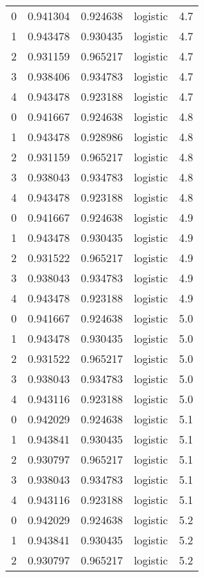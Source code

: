 \begin{tabular}{rrrlr}
     0 & 0.941304 & 0.924638 & logistic &        4.7 \\
     1 & 0.943478 & 0.930435 & logistic &        4.7 \\
     2 & 0.931159 & 0.965217 & logistic &        4.7 \\
     3 & 0.938406 & 0.934783 & logistic &        4.7 \\
     4 & 0.943478 & 0.923188 & logistic &        4.7 \\
     0 & 0.941667 & 0.924638 & logistic &        4.8 \\
     1 & 0.943478 & 0.928986 & logistic &        4.8 \\
     2 & 0.931159 & 0.965217 & logistic &        4.8 \\
     3 & 0.938043 & 0.934783 & logistic &        4.8 \\
     4 & 0.943478 & 0.923188 & logistic &        4.8 \\
     0 & 0.941667 & 0.924638 & logistic &        4.9 \\
     1 & 0.943478 & 0.930435 & logistic &        4.9 \\
     2 & 0.931522 & 0.965217 & logistic &        4.9 \\
     3 & 0.938043 & 0.934783 & logistic &        4.9 \\
     4 & 0.943478 & 0.923188 & logistic &        4.9 \\
     0 & 0.941667 & 0.924638 & logistic &        5.0 \\
     1 & 0.943478 & 0.930435 & logistic &        5.0 \\
     2 & 0.931522 & 0.965217 & logistic &        5.0 \\
     3 & 0.938043 & 0.934783 & logistic &        5.0 \\
     4 & 0.943116 & 0.923188 & logistic &        5.0 \\
     0 & 0.942029 & 0.924638 & logistic &        5.1 \\
     1 & 0.943841 & 0.930435 & logistic &        5.1 \\
     2 & 0.930797 & 0.965217 & logistic &        5.1 \\
     3 & 0.938043 & 0.934783 & logistic &        5.1 \\
     4 & 0.943116 & 0.923188 & logistic &        5.1 \\
     0 & 0.942029 & 0.924638 & logistic &        5.2 \\
     1 & 0.943841 & 0.930435 & logistic &        5.2 \\
     2 & 0.930797 & 0.965217 & logistic &        5.2 \\

\end{tabular}
